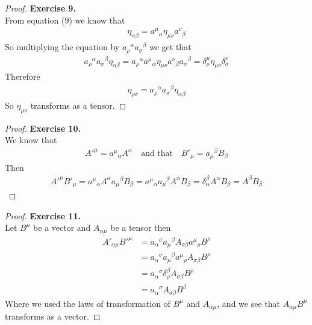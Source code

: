 \documentclass[11pt]{article}
\theoremstyle{definition}
\begin{document}
\begin{proof}{\textbf{Exercise 9.}}\\
From equation (9) we know that
\begin{align*}
    \eta_{\alpha\beta} = {a^\mu}_\alpha \eta_{\mu\nu} {a^\nu}_\beta
\end{align*}
So multiplying the equation by ${a_\rho}^\alpha {a_\sigma}^\beta$ we get that
\begin{align*}
    {a_\rho}^\alpha {a_\sigma}^\beta\eta_{\alpha\beta}
    = {a_\rho}^\alpha {a^\mu}_\alpha \eta_{\mu\nu} {a^\nu}_\beta {a_\sigma}^\beta
    = \delta_\rho^\mu \eta_{\mu\nu} \delta^\nu_\sigma
\end{align*}
Therefore
\begin{align*}
    \eta_{\rho\sigma} = {a_\rho}^\alpha {a_\sigma}^\beta\eta_{\alpha\beta}
\end{align*}
So $\eta_{\mu\nu}$ transforms as a tensor.
\end{proof}

\cleardoublepage
\begin{proof}{\textbf{Exercise 10.}}\\
We know that
\begin{align*}
    A'^\mu = {a^\mu}_\alpha A^\alpha
    \quad\text{and that}
    \quad
    B'_\mu = {a_\mu}^\beta B_\beta
\end{align*}
Then
\begin{align*}
    A'^\mu B'_\mu
    = {a^\mu}_\alpha A^\alpha {a_\mu}^\beta B_\beta
    = {a^\mu}_\alpha {a_\mu}^\beta A^\alpha  B_\beta
    = \delta^\beta_\alpha A^\alpha  B_\beta
    = A^\beta  B_\beta
\end{align*}
\end{proof}

\begin{proof}{\textbf{Exercise 11.}}\\
Let $B^\mu$ be a vector and $A_{\alpha\mu}$ be a tensor then
\begin{align*}
    A'_{\alpha\mu} B'^\mu
    &= {a_\alpha}^\sigma {a_\mu}^\beta A_{\sigma \beta} {a^\mu}_\rho B^\rho \\
    &= {a_\alpha}^\sigma {a_\mu}^\beta {a^\mu}_\rho A_{\sigma \beta} B^\rho \\
    &= {a_\alpha}^\sigma \delta^\beta_\rho A_{\sigma \beta} B^\rho \\
    &= {a_\alpha}^\sigma A_{\sigma \beta} B^\beta
\end{align*}
Where we used the laws of transformation of $B^\mu$ and $A_{\alpha\mu}$, and
we see that $A_{\alpha\mu}B^\mu$ transforms as a vector.
\end{proof}
\end{document}
